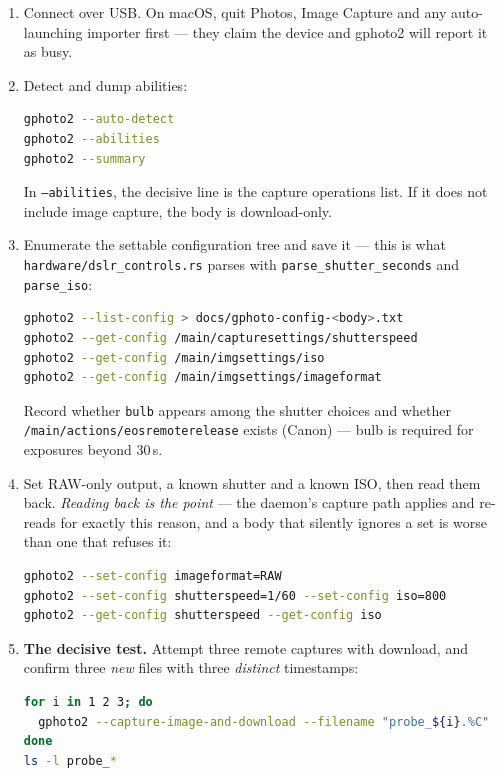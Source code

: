 \documentclass[11pt]{article}
\newcommand{\co}[1]{\texttt{\small #1}}
\begin{document}
\begin{enumerate}
\item Connect over USB. On macOS, quit Photos, Image Capture and any
      auto-launching importer first --- they claim the device and gphoto2 will
      report it as busy.

\item Detect and dump abilities:
\begin{lstlisting}[language=bash]
gphoto2 --auto-detect
gphoto2 --abilities
gphoto2 --summary
\end{lstlisting}
      In \co{--abilities}, the decisive line is the capture operations list. If
      it does not include image capture, the body is download-only.

\item Enumerate the settable configuration tree and save it --- this is what
      \co{hardware/dslr\_controls.rs} parses with \co{parse\_shutter\_seconds}
      and \co{parse\_iso}:
\begin{lstlisting}[language=bash]
gphoto2 --list-config > docs/gphoto-config-<body>.txt
gphoto2 --get-config /main/capturesettings/shutterspeed
gphoto2 --get-config /main/imgsettings/iso
gphoto2 --get-config /main/imgsettings/imageformat
\end{lstlisting}
      Record whether \co{bulb} appears among the shutter choices and whether
      \co{/main/actions/eosremoterelease} exists (Canon) --- bulb is required
      for exposures beyond 30\,s.

\item Set RAW-only output, a known shutter and a known ISO, then read them back.
      \emph{Reading back is the point} --- the daemon's capture path applies and
      re-reads for exactly this reason, and a body that silently ignores a set
      is worse than one that refuses it:
\begin{lstlisting}[language=bash]
gphoto2 --set-config imageformat=RAW
gphoto2 --set-config shutterspeed=1/60 --set-config iso=800
gphoto2 --get-config shutterspeed --get-config iso
\end{lstlisting}

\item \textbf{The decisive test.} Attempt three remote captures with download,
      and confirm three \emph{new} files with three \emph{distinct} timestamps:
\begin{lstlisting}[language=bash]
for i in 1 2 3; do
  gphoto2 --capture-image-and-download --filename "probe_${i}.%C"
done
ls -l probe_*
\end{lstlisting}


\end{enumerate}
\end{document}

